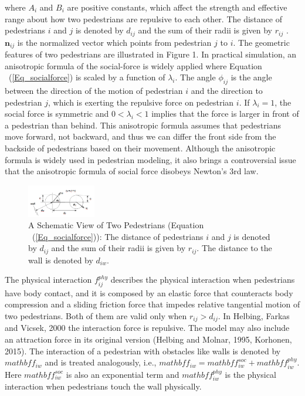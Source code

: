 \documentclass{article}
\begin{document}
\noindent where $A_i$ and $B_i$ are positive constants, which affect the strength and effective range about how two pedestrians are repulsive to each other.  The distance of pedestrians $i$ and $j$ is denoted by $d_{ij}$ and the sum of their radii is given by $r_{ij}$ .  $\mathbf{n}_{ij}$ is the normalized vector which points from pedestrian $j$ to $i$.  The geometric features of two pedestrians are illustrated in Figure 1.  In practical simulation, an anisotropic formula of the social-force is widely applied where Equation ~(\ref{Eq_socialforce}) is scaled by a function of $λ_i$.  The angle $\phi_{ij}$  is the angle between the direction of the motion of pedestrian $i$ and the direction to pedestrian $j$, which is exerting the repulsive force on pedestrian $i$. If $λ_i = 1$, the social force is symmetric and $0 < λ_i < 1$ implies that the force is larger in front of a pedestrian than behind.  This anisotropic formula assumes that pedestrians move forward, not backward, and thus we can differ the front side from the backside of pedestrians based on their movement.  Although the anisotropic formula is widely used in pedestrian modeling, it also brings a controversial issue that the anisotropic formula of social force disobeys Newton's 3rd law.

%
\begin{figure}[tb]
  \centerline{\includegraphics[clip=true, width=30mm]{FIGURES/twoAgents.png}}
  \caption{A Schematic View of Two Pedestrians (Equation ~(\ref{Eq_socialforce})):
The distance of pedestrians $i$ and $j$ is denoted by $d_{ij}$ and the sum of their radii is given by $r_{ij}$. The distance to the wall is denoted by $d_{iw}$.}\label{Fig_twoAgents}
\end{figure}
%

The physical interaction $f_{ij}^{phy}$ describes the physical interaction when pedestrians have body contact, and it is composed by an elastic force that counteracts body compression and a sliding friction force that impedes relative tangential motion of two pedestrians.  Both of them are valid only when $r_{ij} > d_{ij}$.  In Helbing, Farkas and Vicsek, 2000 the interaction force is repulsive.  The model may also include an attraction force in its original version (Helbing and Molnar, 1995, Korhonen, 2015).  The interaction of a pedestrian with obstacles like walls is denoted by $mathbf{f}_{iw}$ and is treated analogously, i.e., $mathbf{f}_{iw} = mathbf{f}_{iw}^{soc} + mathbf{f}_{iw}^{phy}$.  Here $mathbf{f}_{iw}^{soc}$  is also an exponential term and $mathbf{f}_{iw}^{phy}$ is the physical interaction when pedestrians touch the wall physically.  
\end{document}
